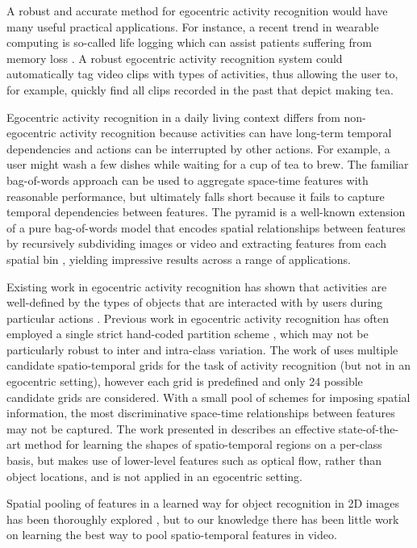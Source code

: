 \documentclass{bmvc2k}
\begin{document}
	A robust and accurate method for egocentric activity recognition would have 
	many useful practical applications. For instance,
	a recent trend in wearable computing is so-called life logging which can
	assist patients suffering from memory loss \cite{Sellen07}. 
	A robust egocentric activity recognition
	system could automatically tag video clips with types of activities,
	thus allowing the user to, for
	example, quickly find all clips recorded in the past that depict making tea.
	
  Egocentric activity recognition in a daily living context differs from
  non-egocentric activity recognition because activities can have long-term
  temporal dependencies and actions can be interrupted by other actions. For
  example, a user might wash a few dishes while waiting for a cup of tea
  to brew. The familiar bag-of-words approach can be used to aggregate space-time
  features with reasonable performance, but ultimately falls short because it
  fails to capture temporal dependencies between features.
  The pyramid is a well-known extension of a pure bag-of-words model that encodes spatial
  relationships between features by recursively subdividing images or video and extracting 
  features from each spatial bin \cite{Lazebnik06}, yielding impressive
  results across a range of applications.
  
  Existing work in egocentric activity recognition has shown that activities
  are well-defined by the types of objects that are interacted with by users
  during particular actions \cite{Ramanan12}. 
  Previous work in egocentric activity recognition has often employed a single strict
  hand-coded partition scheme \cite{Ramanan12}, which may not be particularly robust to
  inter and intra-class variation. The work of \cite{Laptev08} uses multiple
  candidate spatio-temporal grids for the task of activity recognition (but
  not in an egocentric setting), however each grid is predefined and only 24
  possible
  candidate grids are considered. With a small pool of schemes for imposing spatial
  information, the most discriminative space-time relationships between features may not be 
  captured. The work presented in \cite{Kovashka10}
  describes an effective state-of-the-art method for learning the shapes of spatio-temporal
  regions on a per-class basis, but makes use of lower-level features such as
  optical flow, rather than object locations, and
  is not applied in an egocentric setting.

  Spatial pooling of features in a learned way for object recognition in 2D images
  has been thoroughly
  explored \cite{Sharma11}, but to our knowledge there has been little work
  on learning the best way to pool spatio-temporal features in video.
  
\end{document}
